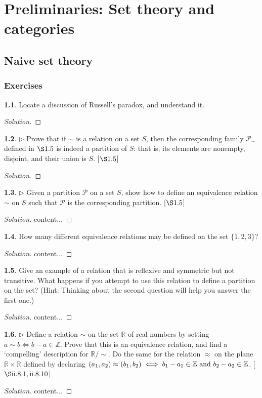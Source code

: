 \documentclass{report}
\newcommand{\extitle}{\subsection*{Exercises}}
\newcommand{\RN}[1]{%
	\textup{\uppercase\expandafter{\romannumeral#1}}%
}
\theoremstyle{definition}
\newtheorem{exercise}{}[chapter]
\newenvironment{solution}
{\begin{proof}[Solution]}
	{\end{proof}}
\begin{document}
	\chapter{Preliminaries: Set theory and categories}
	\section{Naive set theory}
	\extitle
	\begin{exercise}
		Locate a discussion of Russell's paradox, and understand it.
	\end{exercise}
	\begin{solution}
	\end{solution}
	\begin{exercise}
		$\triangleright$ Prove that if $\sim$ is a relation on a set $S$, then the corresponding family $\mathscr{P}_{\sim}$ defined in $\S1.5$  is indeed a partition of $S$: that is, its elements are nonempty, disjoint, and their union is $S$. [$\S1.5$]
	\end{exercise}
	\begin{solution}
	\end{solution}
	\begin{exercise}
		$\triangleright$ Given a partition $\mathscr{P}$ on a set $S$, show how to define an equivalence relation $\sim$ on $S$ such that $\mathscr{P}$ is the corresponding partition. [$\S1.5$]
	\end{exercise}
	\begin{solution}
		content...
	\end{solution}
	\begin{exercise}
		How many different equivalence relations may be defined on the set $\{1,2,3\}$?
	\end{exercise}
	\begin{solution}
		content...
	\end{solution}
	\begin{exercise}
		Give an example of a relation that is reflexive and symmetric but not transitive. What happens if you attempt to use this relation to define a partition on the set? (Hint: Thinking about the second question will help you answer the first one.)
	\end{exercise}
	\begin{solution}
		content...
	\end{solution}
	\begin{exercise}
		$\triangleright$ Define a relation $\sim$ on the set $\mathbb{R}$ of real numbers by setting $a \sim b \iff b-a\in \mathbb{Z}$. Prove that this is an equivalence relation, and find a `compelling' description for $\mathbb{R}/{\sim}$. Do the same for the relation $\approx$ on the plane $\mathbb{R} \times \mathbb{R}$ defined by declaring $(a_1,a_2) \approx (b_1,b_2) \iff b_1 - a_1 \in \mathbb{Z}\textnormal{ and }b_2 - a_2\in\mathbb{Z}$. [$\S \RN{2}.8.1,\RN{2}.8.10$]
	\end{exercise}
	\begin{solution}
		content...
	\end{solution}
\end{document}
